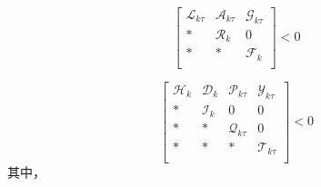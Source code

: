 	\begin{equation} \label{T3C2}
	\begin{bmatrix}
	\mathscr{L}_{k\tau }&\mathscr{A}_{k\tau }&\mathscr{G}_{k\tau }\\
	*&\mathscr{R}_{k}&0\\
	*&*&\mathscr{F}_{k}\\
	\end{bmatrix}<0
	\end{equation}
	
	\begin{equation}\label{T3C3}
	\begin{bmatrix}
	\mathscr{H}_{k}&\mathscr{D}_{k}&\mathscr{P}_{k\tau }&\mathscr{Y}_{k\tau }\\
	*&\mathscr{I}_{k}&0&0\\
	*&*&\mathscr{Q}_{k\tau }&0\\
	*&*&*&\mathscr{T}_{k\tau }\\
	\end{bmatrix} <0
	\end{equation}
	其中，
